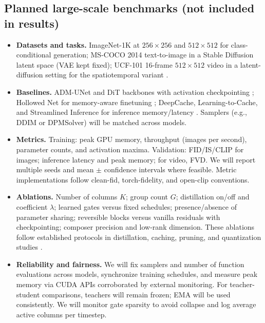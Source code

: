 \documentclass{article}
\begin{document}
\subsection{Planned large-scale benchmarks (not included in results)}
\begin{itemize}
\item \textbf{Datasets and tasks.} ImageNet-1K at $256\times 256$ and $512\times 512$ for class-conditional generation; MS-COCO 2014 text-to-image in a Stable Diffusion latent space (VAE kept fixed); UCF-101 16-frame $512\times 512$ video in a latent-diffusion setting for the spatiotemporal variant \cite{dhariwal-2021-diffusion,blattmann-2023-align}.
\item \textbf{Baselines.} ADM-UNet and DiT backbones with activation checkpointing \cite{dhariwal-2021-diffusion}; Hollowed Net for memory-aware finetuning \cite{cho-2024-hollowed}; DeepCache, Learning-to-Cache, and Streamlined Inference for inference memory/latency \cite{ma-2023-deepcache,ma-2024-learning,zhan-2024-fast}. Samplers (e.g., DDIM or DPMSolver) will be matched across models.
\item \textbf{Metrics.} Training: peak GPU memory, throughput (images per second), parameter counts, and activation maxima. Validation: FID/IS/CLIP for images; inference latency and peak memory; for video, FVD. We will report multiple seeds and mean $\pm$ confidence intervals where feasible. Metric implementations follow clean-fid, torch-fidelity, and open-clip conventions.
\item \textbf{Ablations.} Number of columns $K$; group count $G$; distillation on/off and coefficient $\lambda$; learned gates versus fixed schedules; presence/absence of parameter sharing; reversible blocks versus vanilla residuals with checkpointing; composer precision and low-rank dimension. These ablations follow established protocols in distillation, caching, pruning, and quantization studies \cite{salimans-2024-multistep,ma-2024-learning,fang-2023-structural,so-2023-temporal,li-2023-snapfusion}.
\item \textbf{Reliability and fairness.} We will fix samplers and number of function evaluations across models, synchronize training schedules, and measure peak memory via CUDA APIs corroborated by external monitoring. For teacher-student comparisons, teachers will remain frozen; EMA will be used consistently. We will monitor gate sparsity to avoid collapse and log average active columns per timestep.
\end{itemize}
\end{document}
